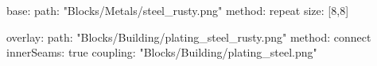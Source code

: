 base:
  path: "Blocks/Metals/steel_rusty.png"
  method: repeat
  size: [8,8]

overlay:
  path: "Blocks/Building/plating_steel_rusty.png"
  method: connect
  innerSeams: true
  coupling: "Blocks/Building/plating_steel.png"